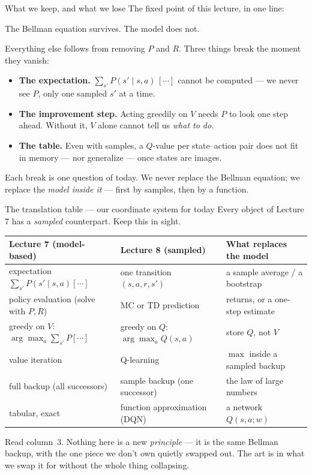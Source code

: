 \documentclass[10pt, aspectratio=169]{beamer}
\begin{document}
\begin{frame}{What we keep, and what we lose}
The fixed point of this lecture, in one line:
\begin{center}\large
\alert{The Bellman equation survives. The model does not.}
\end{center}
\medskip

\pause
Everything else follows from removing $P$ and $R$. Three things break the moment they vanish:
\begin{itemize}\setlength\itemsep{3pt}
\item \textbf{The expectation.} $\sum_{s'} P(s'\mid s,a)\,[\cdots]$ cannot be computed --- we never see $P$, only one sampled $s'$ at a time.
\item \textbf{The improvement step.} Acting greedily on $V$ needs $P$ to look one step ahead. Without it, $V$ alone cannot tell us \emph{what to do}.
\item \textbf{The table.} Even with samples, a $Q$-value per state--action pair does not fit in memory --- nor generalize --- once states are images.
\end{itemize}
\medskip

\pause
Each break is one question of today. We never replace the Bellman equation; we replace the \emph{model inside it} --- first by samples, then by a function.
\end{frame}

\begin{frame}{The translation table --- our coordinate system for today}
Every object of Lecture 7 has a \emph{sampled} counterpart. Keep this in sight.
\medskip
\begin{center}\scriptsize\renewcommand{\arraystretch}{1.55}
\begin{tabular}{l|l|l}
\textbf{Lecture 7 (model-based)} & \textbf{Lecture 8 (sampled)} & \textbf{What replaces the model} \\
\hline
expectation $\sum_{s'} P(s'\mid s,a)[\cdots]$ & one transition $(s,a,r,s')$ & a sample average / a bootstrap \\
policy evaluation (solve with $P,R$) & MC or TD prediction & returns, or a one-step estimate \\
greedy on $V$: $\arg\max_a \sum_{s'}P[\cdots]$ & greedy on $Q$: $\arg\max_a Q(s,a)$ & store $Q$, not $V$ \\
value iteration & Q-learning & $\max$ inside a sampled backup \\
full backup (all successors) & sample backup (one successor) & the law of large numbers \\
tabular, exact & function approximation (DQN) & a network $Q(s,a;w)$ \\
\end{tabular}
\end{center}
\medskip

\pause
Read column~3. Nothing here is a new \emph{principle} --- it is the same Bellman backup, with the one piece we don't own quietly swapped out. The art is in \alert{what we swap it for} without the whole thing collapsing.
\end{frame}
\end{document}
